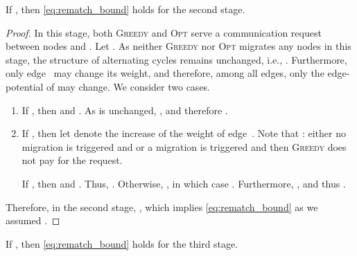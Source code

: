 \documentclass{siamart190516}
\newcommand{\GREEDY}{\textsc{Greedy}\xspace}
\newcommand{\OPT}{\textsc{Opt}\xspace}
\begin{document}
\begin{lemma}
\label{lem:rematch_req}
If , then \eqref{eq:rematch_bound} holds for the second stage.
\end{lemma}

\begin{proof}
In this stage, both \GREEDY and \OPT serve a communication request between
nodes  and . Let . As neither \GREEDY nor \OPT migrates any
nodes in this stage, the structure of alternating cycles remains
unchanged, i.e., . Furthermore, only edge~ may change its
weight, and therefore, among all edges, only the edge-potential of  may
change. We consider two cases.
\begin{enumerate}

\item If , then  and . As
 is unchanged, , and therefore 
. 

\item If , then let  denote the increase 
of the weight of edge~. Note that : 
either no migration is triggered and 
or a migration is triggered and then \GREEDY does not pay for the request.

If , then  and .
Thus, . Otherwise, 
, in which case 
. Furthermore, ,
and thus .
\end{enumerate}

Therefore, in the second stage, ,
which implies \eqref{eq:rematch_bound} as we assumed .
\end{proof}


\begin{lemma}
\label{lem:greedy_swap}
If , 
then  \eqref{eq:rematch_bound} holds for the third stage.
\end{lemma}
\end{document}
